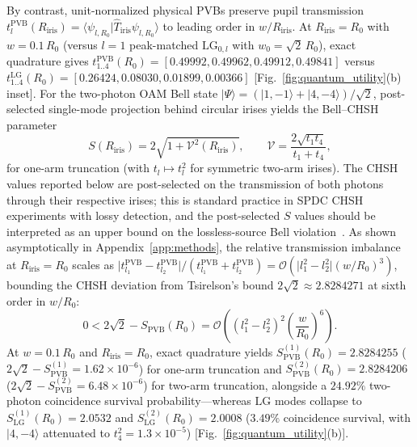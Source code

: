 \documentclass[aps,pra,reprint,nofootinbib,floatfix,longbibliography]{revtex4-2}
\newcommand{\braket}[2]{\langle #1 | #2 \rangle}
\newcommand{\ket}[1]{| #1 \rangle}
\newcommand{\abs}[1]{\lvert #1 \rvert}
\begin{document}
By contrast, unit-normalized physical PVBs preserve pupil transmission $t_l^{\mathrm{PVB}}(R_{\mathrm{iris}}) = \braket{\psi_{l,R_0}}{\hat{T}_{\mathrm{iris}}\psi_{l,R_0}}$ to leading order in $w/R_{\mathrm{iris}}$. At $R_{\mathrm{iris}} = R_0$ with $w = 0.1\,R_0$ (versus $l=1$ peak-matched $\mathrm{LG}_{0,l}$ with $w_0 = \sqrt{2}\,R_0$), exact quadrature gives $t_{1..4}^{\mathrm{PVB}}(R_0) = [0.49992, 0.49962, 0.49912, 0.49841]$ versus $t_{1..4}^{\mathrm{LG}}(R_0) = [0.26424, 0.08030, 0.01899, 0.00366]$ [Fig.~\ref{fig:quantum_utility}(b) inset]. For the two-photon OAM Bell state $\ket{\Psi} = (\ket{1,-1} + \ket{4,-4})/\sqrt{2}$, post-selected single-mode projection behind circular irises yields the Bell--CHSH parameter~\cite{Clauser1969}
\begin{equation}
S(R_{\mathrm{iris}}) = 2\sqrt{1 + \mathcal{V}^2(R_{\mathrm{iris}})}, \qquad \mathcal{V} = \frac{2\sqrt{t_1 t_4}}{t_1 + t_4},
\label{eq:iris_chsh}
\end{equation}
for one-arm truncation (with $t_l \mapsto t_l^2$ for symmetric two-arm irises). The CHSH values reported below are post-selected on the transmission of both photons through their respective irises; this is standard practice in SPDC CHSH experiments with lossy detection, and the post-selected $S$ values should be interpreted as an upper bound on the lossless-source Bell violation~\cite{Walborn2010}. As shown asymptotically in Appendix~\ref{app:methods}, the relative transmission imbalance at $R_{\mathrm{iris}} = R_0$ scales as $\abs{t_{l_1}^{\mathrm{PVB}} - t_{l_2}^{\mathrm{PVB}}}/(t_{l_1}^{\mathrm{PVB}} + t_{l_2}^{\mathrm{PVB}}) = \mathcal{O}(\abs{l_1^2 - l_2^2}(w/R_0)^3)$, bounding the CHSH deviation from Tsirelson's bound $2\sqrt{2} \approx 2.8284271$ at sixth order in $w/R_0$:
\begin{equation}
0 < 2\sqrt{2} - S_{\mathrm{PVB}}(R_0) = \mathcal{O}\!\left((l_1^2 - l_2^2)^2 \left(\frac{w}{R_0}\right)^6\right).
\label{eq:chsh_error_bound}
\end{equation}
At $w = 0.1\,R_0$ and $R_{\mathrm{iris}} = R_0$, exact quadrature yields $S_{\mathrm{PVB}}^{(1)}(R_0) = 2.8284255$ ($2\sqrt{2} - S_{\mathrm{PVB}}^{(1)} = 1.62\times 10^{-6}$) for one-arm truncation and $S_{\mathrm{PVB}}^{(2)}(R_0) = 2.8284206$ ($2\sqrt{2} - S_{\mathrm{PVB}}^{(2)} = 6.48\times 10^{-6}$) for two-arm truncation, alongside a $24.92\%$ two-photon coincidence survival probability---whereas $\mathrm{LG}$ modes collapse to $S_{\mathrm{LG}}^{(1)}(R_0) = 2.0532$ and $S_{\mathrm{LG}}^{(2)}(R_0) = 2.0008$ ($3.49\%$ coincidence survival, with $\ket{4,-4}$ attenuated to $t_4^2 = 1.3\times 10^{-5}$) [Fig.~\ref{fig:quantum_utility}(b)].
\end{document}
